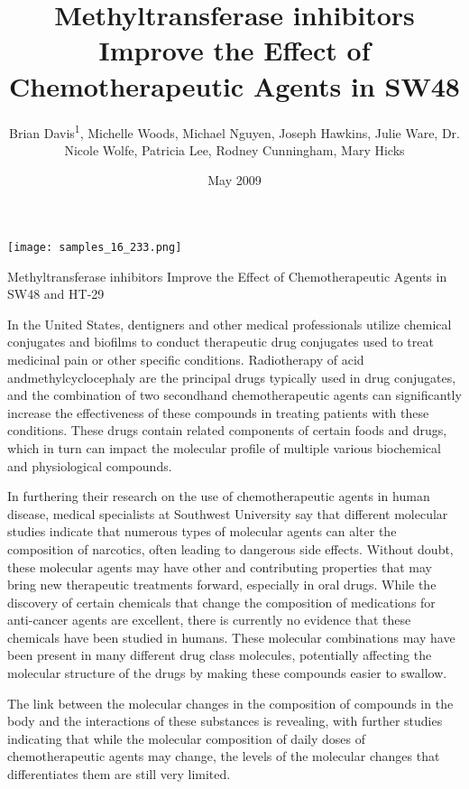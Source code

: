 \documentclass{article}
\title{Methyltransferase inhibitors Improve the Effect of Chemotherapeutic Agents in SW48}
\author{Brian Davis\textsuperscript{1},  Michelle Woods,  Michael Nguyen,  Joseph Hawkins,  Julie Ware,  Dr. Nicole Wolfe,  Patricia Lee,  Rodney Cunningham,  Mary Hicks}
\affil{\textsuperscript{1}University of Milan}
\date{May 2009}
\begin{document}
\maketitle

\begin{center}
\begin{minipage}{0.75\linewidth}
\texttt{[image: samples\_16\_233.png]}
\end{minipage}
\end{center}

Methyltransferase inhibitors Improve the Effect of Chemotherapeutic Agents in SW48 and HT-29

In the United States, dentigners and other medical professionals utilize chemical conjugates and biofilms to conduct therapeutic drug conjugates used to treat medicinal pain or other specific conditions. Radiotherapy of acid andmethylcyclocephaly are the principal drugs typically used in drug conjugates, and the combination of two secondhand chemotherapeutic agents can significantly increase the effectiveness of these compounds in treating patients with these conditions. These drugs contain related components of certain foods and drugs, which in turn can impact the molecular profile of multiple various biochemical and physiological compounds.

In furthering their research on the use of chemotherapeutic agents in human disease, medical specialists at Southwest University say that different molecular studies indicate that numerous types of molecular agents can alter the composition of narcotics, often leading to dangerous side effects. Without doubt, these molecular agents may have other and contributing properties that may bring new therapeutic treatments forward, especially in oral drugs. While the discovery of certain chemicals that change the composition of medications for anti-cancer agents are excellent, there is currently no evidence that these chemicals have been studied in humans. These molecular combinations may have been present in many different drug class molecules, potentially affecting the molecular structure of the drugs by making these compounds easier to swallow.

The link between the molecular changes in the composition of compounds in the body and the interactions of these substances is revealing, with further studies indicating that while the molecular composition of daily doses of chemotherapeutic agents may change, the levels of the molecular changes that differentiates them are still very limited.
\end{document}
